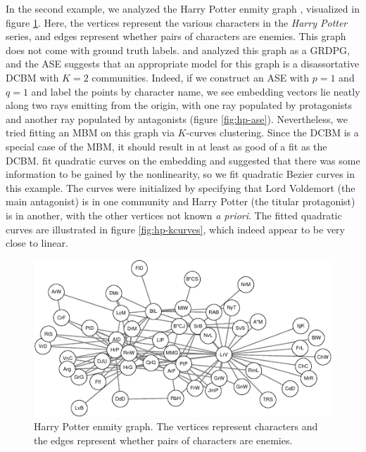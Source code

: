 \documentclass[
  12pt,
]{article}
\theoremstyle{definition}
\theoremstyle{definition}
\theoremstyle{definition}
\theoremstyle{definition}
\theoremstyle{remark}
\begin{document}
In the second example, we analyzed the Harry Potter enmity graph \citep{harrypotter}, visualized in figure \ref{fig:hp}.
Here, the vertices represent the various characters in the \emph{Harry Potter} series, and edges represent whether pairs of characters are enemies.
This graph does not come with ground truth labels.
\citet{rubindelanchy2017statistical} and \citet{SannaPassino2022} analyzed this graph as a GRDPG, and the ASE suggests that an appropriate model for this graph is a disassortative DCBM with \(K = 2\) communities.
Indeed, if we construct an ASE with \(p = 1\) and \(q = 1\) and label the points by character name, we see embedding vectors lie neatly along two rays emitting from the origin, with one ray populated by protagonists and another ray populated by antagonists (figure \ref{fig:hp-ase}).
Nevertheless, we tried fitting an MBM on this graph via \(K\)-curves clustering.
Since the DCBM is a special case of the MBM, it should result in at least as good of a fit as the DCBM.
\citet{SannaPassino2022} fit quadratic curves on the embedding and suggested that there was some information to be gained by the nonlinearity, so we fit quadratic Bezier curves in this example.
The curves were initialized by specifying that Lord Voldemort (the main antagonist) is in one community and Harry Potter (the titular protagonist) is in another, with the other vertices not known \emph{a priori}.
The fitted quadratic curves are illustrated in figure \ref{fig:hp-kcurves}, which indeed appear to be very close to linear.

\begin{figure}[H]

{\centering \includegraphics{draft_files/figure-latex/hp-1} 

}

\caption{Harry Potter enmity graph. The vertices represent characters and the edges represent whether pairs of characters are enemies.}\label{fig:hp}
\end{figure}
\end{document}
